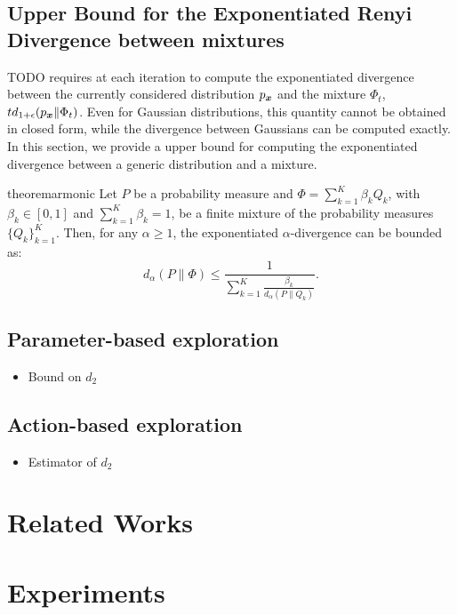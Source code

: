 \documentclass{article}
\makeatletter
\DeclareRobustCommand{\algoname}{TODO\@\xspace}
\makeatother
\begin{document}
\subsection{Upper Bound for the Exponentiated Renyi Divergence between mixtures}
\algoname requires at each iteration to compute the exponentiated \Renyi divergence between the currently considered distribution $p_{\boldsymbol{x}}$ 
and the mixture $\Phi_t$, \ie $td_{1+\epsilon}(p_{\boldsymbol{x}}\|\Phi_t)$. Even for Gaussian distributions, this quantity cannot be obtained in closed form, while
the \Renyi divergence between Gaussians can be computed exactly. In this section, we provide a upper bound for computing the exponentiated \Renyi divergence
between a generic distribution and a mixture.
\begin{restatable}{theorem}{armonic}\label{th:armonic}
	Let $P$ be a probability measure and $\Phi = \sum_{k=1}^K \beta_k Q_k$, with $\beta_k \in [0,1]$ and $\sum_{k=1}^K \beta_k =1$, be a finite mixture of the
	probability measures $\{Q_k\}_{k=1}^K$. Then, for any $\alpha \ge 1$, the exponentiated $\alpha$-\Renyi divergence can be bounded as: 
    \begin{equation*}
        d_{\alpha}(P \| \Phi) \le \frac{1} {\sum_{k=1}^K \frac{ \beta_k}{ d_{\alpha}(P \| Q_k)}}.
    \end{equation*}
\end{restatable}

\subsection{Parameter-based exploration}
\begin{itemize}
	\item Bound on $d_2$
\end{itemize}
\subsection{Action-based exploration}
\begin{itemize}
	\item Estimator of $d_2$
\end{itemize}

\section{Related Works}

\section{Experiments}
\end{document}
